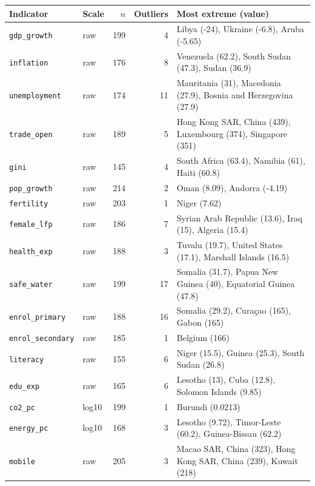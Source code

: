 \footnotesize
\begin{tabular}{llrrp{9cm}}
\toprule
Indicator & Scale & $n$ & Outliers & Most extreme (value) \\
\midrule
\texttt{gdp\_growth} & raw & 199 & 4 & Libya (-24), Ukraine (-6.8), Aruba (-5.65) \\
\texttt{inflation} & raw & 176 & 8 & Venezuela (62.2), South Sudan (47.3), Sudan (36.9) \\
\texttt{unemployment} & raw & 174 & 11 & Mauritania (31), Macedonia (27.9), Bosnia and Herzegovina (27.9) \\
\texttt{trade\_open} & raw & 189 & 5 & Hong Kong SAR, China (439), Luxembourg (374), Singapore (351) \\
\texttt{gini} & raw & 145 & 4 & South Africa (63.4), Namibia (61), Haiti (60.8) \\
\texttt{pop\_growth} & raw & 214 & 2 & Oman (8.09), Andorra (-4.19) \\
\texttt{fertility} & raw & 203 & 1 & Niger (7.62) \\
\texttt{female\_lfp} & raw & 186 & 7 & Syrian Arab Republic (13.6), Iraq (15), Algeria (15.4) \\
\texttt{health\_exp} & raw & 188 & 3 & Tuvalu (19.7), United States (17.1), Marshall Islands (16.5) \\
\texttt{safe\_water} & raw & 199 & 17 & Somalia (31.7), Papua New Guinea (40), Equatorial Guinea (47.8) \\
\texttt{enrol\_primary} & raw & 188 & 16 & Somalia (29.2), Curaçao (165), Gabon (165) \\
\texttt{enrol\_secondary} & raw & 185 & 1 & Belgium (166) \\
\texttt{literacy} & raw & 155 & 6 & Niger (15.5), Guinea (25.3), South Sudan (26.8) \\
\texttt{edu\_exp} & raw & 165 & 6 & Lesotho (13), Cuba (12.8), Solomon Islands (9.85) \\
\texttt{co2\_pc} & log10 & 199 & 1 & Burundi (0.0213) \\
\texttt{energy\_pc} & log10 & 168 & 3 & Lesotho (9.72), Timor-Leste (60.2), Guinea-Bissau (62.2) \\
\texttt{mobile} & raw & 205 & 3 & Macao SAR, China (323), Hong Kong SAR, China (239), Kuwait (218) \\
\bottomrule
\end{tabular}
